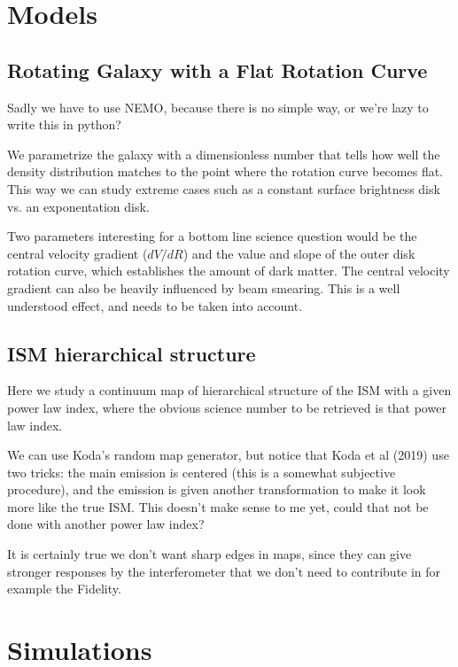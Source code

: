 \documentclass[11pt,twoside]{article}
\begin{document}
\section{Models}

\subsection{Rotating Galaxy with a Flat Rotation Curve}

Sadly we have to use NEMO, because there is no simple way, or we're
lazy to write this in python?


We parametrize the galaxy with a dimensionless number that tells how
well the density distribution matches to the point where the rotation
curve becomes flat. This way we can study extreme cases such as a
constant surface brightness disk vs. an exponentation disk.

Two parameters interesting for a bottom line science question would be
the central velocity gradient ($dV/dR$) and the value and slope of the
outer disk rotation curve, which establishes the amount of dark
matter. The central velocity gradient can also be heavily influenced
by beam smearing. This is a well understood effect, and needs to be
taken into account.

\subsection{ISM hierarchical structure}

Here we study a continuum map of hierarchical structure of the ISM
with a given power law index, where the obvious science number to be
retrieved is that power law index.

We can use Koda's random map generator, but notice that Koda et al
(2019) use two tricks: the main emission is centered (this is a
somewhat subjective procedure), and the emission is given another
transformation to make it look more like the true ISM.  This doesn't
make sense to me yet, could that not be done with another power law
index?

It is certainly true  we don't want sharp edges in maps, since they can give stronger responses by the
interferometer that we don't need to contribute in for example the Fidelity.



\section{Simulations}
\end{document}

